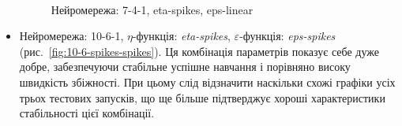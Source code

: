 \documentclass[a4paper,10pt,fleqn]{article}
\begin{document}
\begin{itemize}
\begin{figure}[h!]
  \centering
  \,  \,
  \caption{Нейромережа: 7-4-1, eta-spikes, eps-linear}
  \label{fig:7-4-spikes-linear}
\end{figure}

\item Нейромережа: 10-6-1, $\eta$-функція: \textit{eta-spikes}, $\varepsilon$-функція: \textit{eps-spikes} (рис.~\ref{fig:10-6-spikes-spikes}). Ця комбінація параметрів показує себе дуже добре, забезпечуючи стабільне успішне навчання і порівняно високу швидкість збіжності. При цьому слід відзначити наскільки схожі графіки усіх трьох тестових запусків, що ще більше підтверджує хороші характеристики стабільності цієї комбінації.


\end{itemize}
\end{document}
